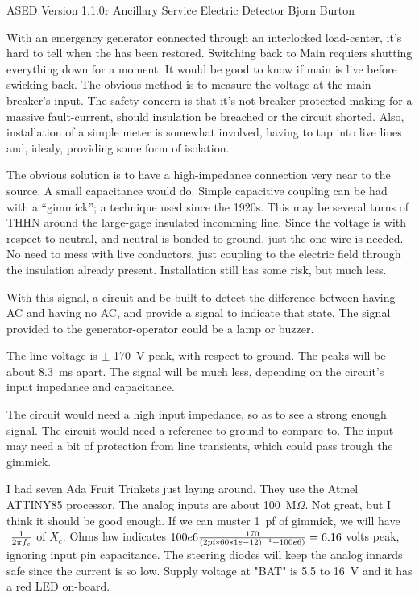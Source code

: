 


\nocon %
\datethis %


ASED Version 1.1.0r
Ancillary Service Electric Detector
Bjorn Burton

With an emergency generator connected through an interlocked load-center, it's
hard to tell when the  has been restored.
Switching back to Main requiers shutting  everything down for a moment.
It would be good to know if main is live before swicking back. The obvious
method is to measure the voltage at the main-breaker's input.
The safety concern is that it's not breaker-protected making for a massive
fault-current,
should insulation be breached or the circuit shorted.
Also, installation of a simple meter is somewhat involved, having to tap into
live lines and, idealy, providing some form of isolation.

The obvious solution is to have a high-impedance connection very near to the
source.
A small capacitance would do.
Simple capacitive coupling can be had with a ``gimmick''; a technique used
since the 1920s.
This may be several turns of THHN around the large-gage insulated incomming
line.
Since the voltage is with respect to neutral, and neutral is bonded to ground,
just the one wire is needed.
No need to mess with live conductors, just coupling to the electric field
through the insulation already present. Installation still has some risk, but
much less.

With this signal, a circuit and be built to detect the difference between
having AC and having no AC,
and provide a signal to indicate that state.
The signal provided to the generator-operator could be a lamp or buzzer.

The line-voltage is $\pm$ 170~V peak, with respect to ground.
The peaks will be about 8.3~ms apart.
The signal will be much less, depending on the circuit's input impedance and
capacitance.

The circuit would need a high input impedance, so as to see a strong enough
signal.
The circuit would need a reference to ground to compare to.
The input may need a bit of protection from line transients, which could pass
trough the gimmick.

I had seven Ada Fruit Trinkets just laying around. They use the Atmel
ATTINY85 processor. The analog inputs are about 100~M$\Omega$. Not great, but
I think it should be good enough. If we can muster 1~pf of gimmick, we will
have $\ {1 \over 2 \pi f_c} $ of $X_c$. Ohms law indicates
$100e6 {170 \over  {(2pi*60*1e-12)^{-1} + 100e6)} } = 6.16 $ volts peak,
ignoring
input pin capacitance. The steering diodes will keep the analog innards safe
since the current is so low. Supply voltage at "BAT" is 5.5 to 16~V and it has
a red LED on-board.

